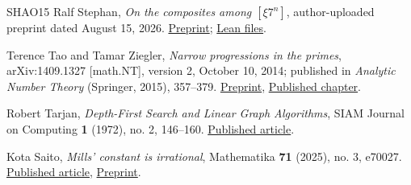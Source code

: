 \documentclass[11pt,reqno]{amsart}
\theoremstyle{definition}
\theoremstyle{definition}
\theoremstyle{remark}
\begin{document}
\begin{thebibliography}{SHAO15}
\label{ref-s26}
Ralf Stephan, \emph{On the composites among \([\xi 7^n]\)}, author-uploaded
preprint dated August 15, 2026.
\href{https://www.researchgate.net/publication/412294027_On_the_composites_among_x7}{Preprint};
\href{https://github.com/rwst/On-Composites}{Lean files}.

\label{ref-tz14}
Terence Tao and Tamar Ziegler, \emph{Narrow progressions in the
primes}, arXiv:1409.1327 {[}math.NT{]}, version 2, October 10, 2014;
published in \emph{Analytic Number Theory} (Springer, 2015), 357--379.
\href{https://arxiv.org/abs/1409.1327v2}{Preprint},
\href{https://doi.org/10.1007/978-3-319-22240-0_22}{Published chapter}.

\label{ref-t}
Robert Tarjan, \emph{Depth-First Search and Linear Graph Algorithms},
SIAM Journal on Computing \textbf{1} (1972), no. 2, 146--160.
\href{https://doi.org/10.1137/0201010}{Published article}.

\label{ref-sa25}
Kota Saito, \emph{Mills' constant is irrational},
Mathematika \textbf{71} (2025), no. 3, e70027.
\href{https://doi.org/10.1112/mtk.70027}{Published article},
\href{https://arxiv.org/abs/2404.19461}{Preprint}.

\end{thebibliography}
\end{document}
